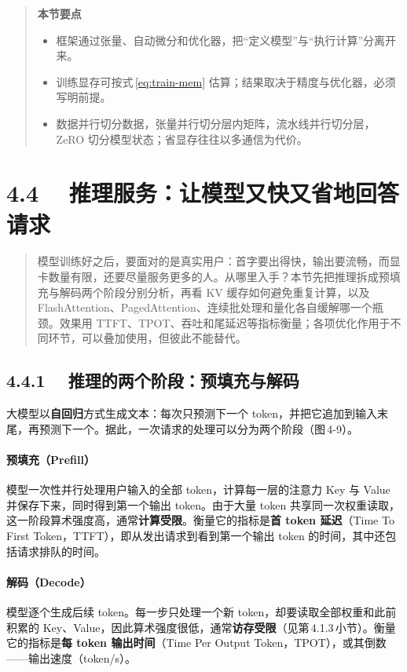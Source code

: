 \documentclass{article}
\begin{document}
\begin{quote}
\textbf{本节要点}


\begin{itemize}[leftmargin=1.5em]
  \item 框架通过张量、自动微分和优化器，把“定义模型”与“执行计算”分离开来。
  \item 训练显存可按式\,\eqref{eq:train-mem} 估算；结果取决于精度与优化器，必须写明前提。
  \item 数据并行切分数据，张量并行切分层内矩阵，流水线并行切分层，ZeRO 切分模型状态；省显存往往以多通信为代价。
\end{itemize}
\end{quote}

\section*{4.4　 推理服务：让模型又快又省地回答请求}


\begin{quote}


\noindent 模型训练好之后，要面对的是真实用户：首字要出得快，输出要流畅，而显卡数量有限，还要尽量服务更多的人。从哪里入手？本节先把推理拆成预填充与解码两个阶段分别分析，再看 KV 缓存如何避免重复计算，以及 FlashAttention、PagedAttention、连续批处理和量化各自缓解哪一个瓶颈。效果用 TTFT、TPOT、吞吐和尾延迟等指标衡量；各项优化作用于不同环节，可以叠加使用，但彼此不能替代。


\end{quote}

\subsection*{4.4.1　 推理的两个阶段：预填充与解码}


大模型以\textbf{自回归}方式生成文本：每次只预测下一个 token，并把它追加到输入末尾，再预测下一个。据此，一次请求的处理可以分为两个阶段（图\,4-9）。

\paragraph{预填充（Prefill）} 模型一次性并行处理用户输入的全部 token，计算每一层的注意力 Key 与 Value 并保存下来，同时得到第一个输出 token。由于大量 token 共享同一次权重读取，这一阶段算术强度高，通常\textbf{计算受限}。衡量它的指标是\textbf{首 token 延迟}（{Time To First Token}，TTFT），即从发出请求到看到第一个输出 token 的时间，其中还包括请求排队的时间。

\paragraph{解码（Decode）} 模型逐个生成后续 token。每一步只处理一个新 token，却要读取全部权重和此前积累的 Key、Value，因此算术强度很低，通常\textbf{访存受限}（见第\,4.1.3\,小节）。衡量它的指标是\textbf{每 token 输出时间}（{Time Per Output Token}，TPOT），或其倒数——输出速度（token/s）。
\end{document}
